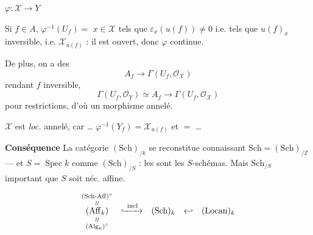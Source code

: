\documentclass[11pt,a4paper]{article}
\begin{document}
 $\varphi : \mathcal{X} \to Y$

Si $f \in A$, $\varphi^{-1}(U_f) = $  $x \in \mathcal{X}$ tels que $\varepsilon_x(u(f)) \neq 0$ i.e. tels que $u(f)_x$ inversible, i.e. $\mathcal{X}_{u(f)}$ : il est ouvert, donc $\varphi$ continue.

De plus, on a des
\[
A_f \longrightarrow \Gamma(U_f, \mathcal{O}_{\mathcal{X}})
\]
rendant $f$ inversible,  
\[
\Gamma(U_f, \mathcal{O}_Y) \simeq A_f \longrightarrow \Gamma(U_f, \mathcal{O}_{\mathcal{X}})
\]
 pour restrictions, d'où un morphisme annelé.

$\mathcal{X}$ est \emph{loc.} annelé, car \struck{\ill{}, \ill{}} \struck{\ill{}} \ldots{} $\varphi^{-1}(Y_f) = \mathcal{X}_{u(f)}$ et  $=$  \ill{} …

\textbf{Conséquence} La catégorie $(\mathrm{Sch})_{/k}$ se reconstitue connaissant $\mathrm{Sch} = (\mathrm{Sch})_{/\mathbb{Z}}$ --- et $S = \operatorname{Spec} k$ comme $(\mathrm{Sch})_{/S}$ : les  sont les $S$-schémas. Mais $\mathrm{Sch}_{/S}$ important  que $S$ soit néc. affine.


\[
\begin{array}{ccccc}
\underset{\substack{\wr\wr \\ (\mathrm{Alg}_k)^{\circ}}}{\overset{\substack{(\mathrm{Sch}\text{-}\mathrm{Aff})^{\circ} \\ \wr\wr}}{(\mathrm{Aff}_k)}} & \xhookrightarrow{\ \mathrm{incl}\ } & (\mathrm{Sch})_k & \hookleftarrow & (\mathrm{Locan})_k
\end{array}
\]
\end{document}
